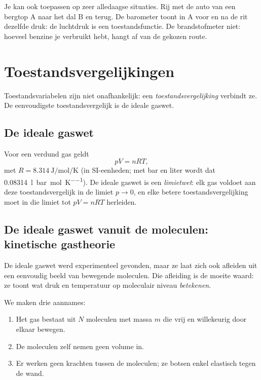Je kan ook toepassen op zeer alledaagse situaties. Rij met de auto van een bergtop A naar het dal B en terug. De barometer toont in A voor en na de rit dezelfde druk: de luchtdruk is een toestandsfunctie. De brandstofmeter niet: hoeveel benzine je verbruikt hebt, hangt af van de gekozen route.


\section{Toestandsvergelijkingen}

Toestandsvariabelen zijn niet onafhankelijk: een \emph{toestandsvergelijking} verbindt ze. De eenvoudigste toestandsvergelijk is de ideale gaswet.

\subsection{De ideale gaswet}

Voor een verdund gas geldt
\begin{equation}
pV = nRT,
\end{equation}
met $R = \SI{8.314}{\joule\per\mole\per\kelvin}$ (in SI-eenheden; met bar en liter wordt dat \SI{0.08314}{\litre\bar\per\mole\per\kelvin}). De ideale gaswet is een \emph{limietwet}: elk gas voldoet aan deze toestandsvergelijk in de limiet $p \to 0$, en elke betere toestandsvergelijking moet in die limiet tot $pV = nRT$ herleiden.


\subsection{De ideale gaswet vanuit de moleculen: kinetische gastheorie}
\label{sec:kinetische-gastheorie}

De ideale gaswet werd experimenteel gevonden, maar ze laat zich ook afleiden uit een eenvoudig beeld van bewegende moleculen. Die afleiding is de moeite waard: ze toont wat druk en temperatuur op moleculair niveau \emph{betekenen}.

We maken drie aannames: 
\begin{enumerate}
    \item Het gas bestaat uit $N$ moleculen met massa $m$ die vrij en willekeurig door elkaar bewegen.
    \item De moleculen zelf nemen geen volume in.
    \item Er werken geen krachten tussen de moleculen; ze botsen enkel elastisch tegen de wand.
\end{enumerate}


